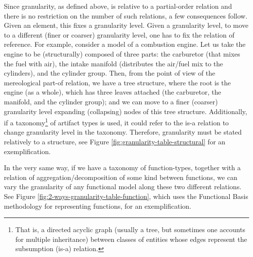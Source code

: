 \documentclass[
]{ceurart}
\begin{document}
\eflist
Since granularity, as defined above, is relative to a partial-order relation and there is no restriction on the number of such relations, a few consequences follow. Given an element, this fixes a granularity level. Given a granularity level, to move to a different (finer or coarser) granularity level, one has to fix the relation of reference. For example, consider a model of a combustion engine. Let us take the engine to be (structurally) composed of three parts: the carburetor (that mixes the fuel with air), the intake manifold (distributes the air/fuel mix to the cylinders), and the cylinder group. Then, from the point of view of the mereological part-of relation, we have a tree structure, where the root is the engine (as a whole), which has three leaves attached (the carburetor, the manifold, and the cylinder group); and we can move to a finer (coarser) granularity level expanding (collapsing) nodes of this tree structure. Additionally, if a taxonomy\footnote{That is, a directed acyclic graph (usually a tree, but sometimes one accounts for multiple inheritance) between classes of entities whose edges represent the subsumption (is-a) relation.} of artifact types is used, it could refer to the is-a relation to change granularity level in the taxonomy. Therefore, granularity must be stated relatively to a structure, see Figure \ref{fig:granularity-table-structural} for an exemplification. 

In the very same way, if we have a taxonomy of function-types, together with a relation of aggregation/decomposition of some kind between functions, we can vary the granularity of any functional model along these two different relations. See Figure \ref{fig:2-ways-granularity-table-function}, which uses the Functional Basis methodology for representing functions, for an exemplification.
\end{document}
